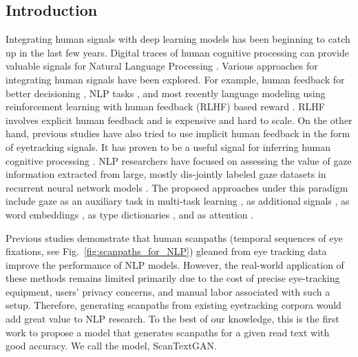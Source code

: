 \subsection{Introduction}
\label{sec:introduction-scantextgan}
Integrating human signals with deep learning models has been beginning to catch up in the last few years. Digital traces of human cognitive processing can provide valuable signals for Natural Language Processing \cite{klerke2016improving,plank-2016-keystroke}. Various approaches for integrating human signals have been explored. For example, human feedback for better decisioning \citep{christiano2017deep}, NLP tasks \citep{stiennon2020learning,wu2021recursively}, and most recently language modeling using reinforcement learning with human feedback (RLHF) based reward \citep{bai2022training,ouyang2022training}. RLHF involves explicit human feedback and is expensive and hard to scale. On the other hand, previous studies have also tried to use implicit human feedback in the form of eyetracking signals.
It has proven to be a useful signal for inferring human cognitive processing \cite{sood2020improving, hollenstein-zhang-2019-entity, ijcaiSurveyGapIdentified}. NLP researchers have focused on assessing the value of gaze information extracted from large, mostly dis-jointly labeled gaze datasets in recurrent neural network models \cite{ren-xiong-2021-cogalign,strzyz-etal-2019-towards,barrett-etal-2018-sequence}. The proposed approaches under this paradigm include gaze as an auxiliary task in multi-task learning \cite{klerke-etal-2016-improving,hollenstein2019advancing}, as additional signals \cite{mishra-etal-2016-harnessing}, as word embeddings \cite{barrett-etal-2018-unsupervised}, as type dictionaries \cite{barrett-etal-2016-weakly,hollenstein-zhang-2019-entity}, and
as attention \cite{barrett-etal-2018-sequence}. 

Previous studies demonstrate that human scanpaths (temporal sequences of eye fixations, see Fig.~\ref{fig:scanpaths_for_NLP}) gleaned from eye tracking data improve the performance of NLP models. However, the real-world application of these methods remains limited primarily due to the cost of precise eye-tracking equipment, users' privacy concerns, and manual labor associated with such a setup. Therefore, generating scanpaths from existing eyetracking corpora would add great value to NLP research. To the best of our knowledge, this is the first work to propose a model that generates scanpaths for a given read text with good accuracy. We call the model, ScanTextGAN.

